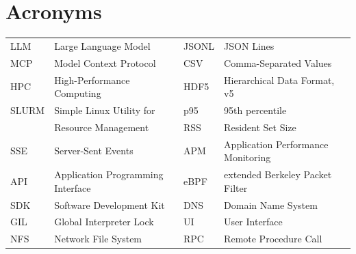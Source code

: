 \documentclass[11pt,a4paper]{report}
\begin{document}
\setcounter{tocdepth}{1}
\tableofcontents
\listoffigures
\begingroup\let\clearpage\relax\listoftables\endgroup

\section*{Acronyms}
\begin{tabular}{@{}ll@{\hspace{2.2em}}ll@{}}
LLM  & Large Language Model            & JSONL& JSON Lines \\
MCP  & Model Context Protocol          & CSV  & Comma-Separated Values \\
HPC  & High-Performance Computing      & HDF5 & Hierarchical Data Format, v5 \\
SLURM& Simple Linux Utility for        & p95  & 95th percentile \\
     & \quad Resource Management       & RSS  & Resident Set Size \\
SSE  & Server-Sent Events              & APM  & Application Performance Monitoring \\
API  & Application Programming Interface & eBPF & extended Berkeley Packet Filter \\
SDK  & Software Development Kit        & DNS  & Domain Name System \\
GIL  & Global Interpreter Lock         & UI   & User Interface \\
NFS  & Network File System             & RPC  & Remote Procedure Call \\
\end{tabular}









{\small

}
\end{document}
